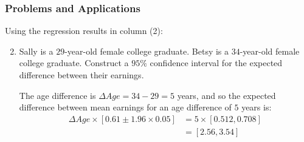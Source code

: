 \begin{frame}
\frametitle{Problems and Applications}
Using the regression results in column (2):

\begin{enumerate}\setcounter{enumi}{1}

\item Sally is a $29$-year-old female college graduate. Betsy is a $34$-year-old female college graduate. Construct a $95\%$ confidence interval for the expected difference between their earnings.

\begin{answer}
The age difference is $\Delta Age = 34-29 = 5$ years, and so the expected difference between mean earnings for an age difference of $5$ years is:
\begin{align*}
\Delta Age \times [0.61 \pm 1.96 \times 0.05]
& = 5 \times [0.512, 0.708] \\
& = [2.56, 3.54]
\end{align*}
\end{answer}

\end{enumerate}

\end{frame}



